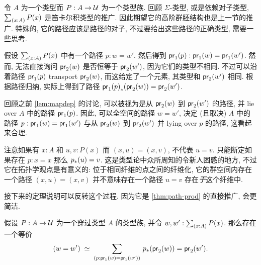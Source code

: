 %
令 $A$ 为一个类型而 $P:A\to\mathcal{U}$ 为一个类型族.
回顾 $\Sigma$-类型, 或是依赖对子类型, $\sm{x:A} P(x)$ 是笛卡尔积类型的推广.
因此期望它的高阶群胚结构也是上一节的推广.
特殊的, 它的路径应该是路径的对子, 不过要给出这些路径的正确类型, 需要一些思考.

假设 $\sm{x:A}P(x)$ 中有一个路径 $p:w=w'$.
然后得到 ${\mathsf{pr}_{1}}\mathopen{}\left({p}\right)\mathclose{}:\mathsf{pr}_{1}(w)=\mathsf{pr}_{1}(w')$.
然而, 无法直接询问 $\mathsf{pr}_{2}(w)$ 是否恒等于 $\mathsf{pr}_{2}(w')$, 因为它们的类型不相同.
不过可以沿着路径 ${\mathsf{pr}_{1}}\mathopen{}\left({p}\right)\mathclose{}$ transport $\mathsf{pr}_{2}(w)$, 而这给定了一个元素, 其类型和 $\mathsf{pr}_{2}(w')$ 相同.
根据路径归纳, 实际上得到了路径 ${{\mathsf{pr}_{1}}\mathopen{}\left({p}\right)\mathclose{}}_{*}\mathopen{}\left({\mathsf{pr}_{2}(w)}\right)\mathclose{}=\mathsf{pr}_{2}(w')$.

回顾之前 \cref{lem:mapdep} 的讨论,
可以被视为是从 $\mathsf{pr}_{2}(w)$ 到 $\mathsf{pr}_{2}(w')$ 的路径, 并 lie over $A$ 中的路径 ${\mathsf{pr}_{1}}\mathopen{}\left({p}\right)\mathclose{}$.
%
%
因此, 可以全空间的路径 $w=w'$, 决定 (且取决) $A$ 中的路径 $p:\mathsf{pr}_{1}(w)=\mathsf{pr}_{1}(w')$ 与从 $\mathsf{pr}_{2}(w)$ 到 $\mathsf{pr}_{2}(w')$ 并 lying over $p$ 的路径, 这看起来合理.

\begin{rmk}
    注意如果有 $x:A$ 和 $u,v:P(x)$ 而 $(x,u)=(x,v)$, 不代表 $u=v$.
    只能断定如果存在 $p:x=x$ 那么 ${p}_{*}\mathopen{}\left({u}\right)\mathclose{} = v$.
    这是类型论中众所周知的令新人困惑的地方, 不过它在拓扑学观点是有意义的:
    位于相同纤维的点之间的纤维化, 它的群空间内存在一个路径 $(x,u)=(x,v)$ 并不意味存在一个路径 $u=v$ 存在\emph{于}这个纤维中.
\end{rmk}

接下来的定理说明可以反转这个过程.
因为它是 \cref{thm:path-prod} 的直接推广, 会更简洁.

\begin{thm}
    \label{thm:path-sigma}
    假设 $P:A\to\mathcal{U}$ 为一个穿过类型 $A$ 的类型族, 并令 $w,w':\sm{x:A}P(x)$. 那么存在一个等价
    \begin{equation*}
        \eqvspaced{(w=w')}{\dsm{p:\proj{1}(w)=\proj{1}(w')} \trans{p}{\proj{2}(w)}=\proj{2}(w')}.
    \end{equation*}
\end{thm}

